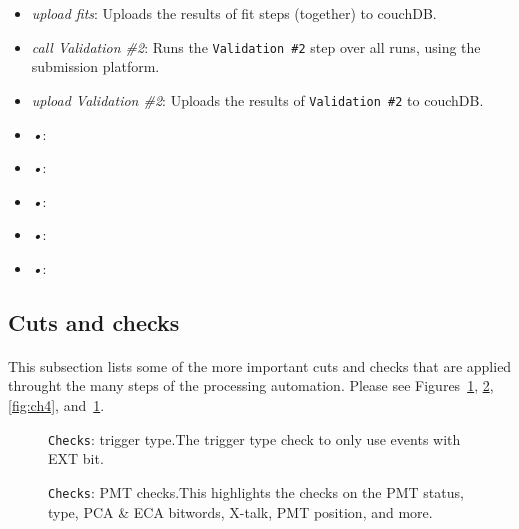 \documentclass[12pt]{article}
\begin{document}
\begin{itemize}
	\item \textit{upload fits}: Uploads the results of fit steps (together) to couchDB.
	\item \textit{call Validation \#2}: Runs the \texttt{Validation \#2} step over all runs, using the submission platform. 
	\item \textit{upload Validation \#2}: Uploads the results of \texttt{Validation \#2} to couchDB.
	\item \textit{•}: 
	\item \textit{•}: 
	\item \textit{•}: 
	\item \textit{•}: 
	\item \textit{•}: 
\end{itemize}

\subsection{Cuts and checks}
\paragraph{}
This subsection lists some of the more important cuts and checks that are applied throught the many steps of the processing automation. Please see Figures~\ref{fig:ch1}, \ref{fig:ch2}, \ref{fig:ch4}, and~\ref{fig:ch1}.

\begin{figure}
\centering
\noindent{}
  \caption{\centering \texttt{Checks}: trigger type.\hspace{\textwidth}The trigger type check to only use events with EXT bit.}
  \label{fig:ch1}
\end{figure}

\begin{figure}
\centering
\noindent{}
  \caption{\centering \texttt{Checks}: PMT checks.\hspace{\textwidth}This highlights the checks on the PMT status, type, PCA \& ECA bitwords, X-talk, PMT position, and more.}
  \label{fig:ch2}
\end{figure}
\end{document}
